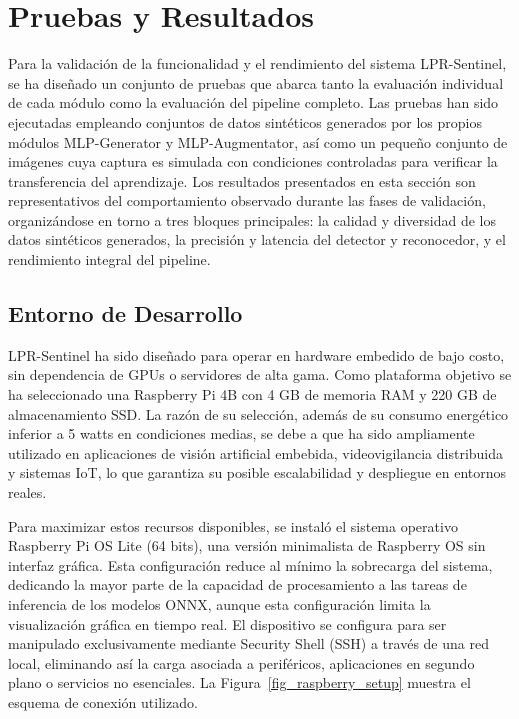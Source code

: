 \section{Pruebas y Resultados}
Para la validación de la funcionalidad y el rendimiento del sistema LPR-Sentinel, se ha diseñado un conjunto de pruebas que abarca tanto la evaluación individual de cada módulo como la evaluación del pipeline completo. Las pruebas han sido ejecutadas empleando conjuntos de datos sintéticos generados por los propios módulos MLP-Generator y MLP-Augmentator, así como un pequeño conjunto de imágenes cuya captura es simulada con condiciones controladas para verificar la transferencia del aprendizaje. Los resultados presentados en esta sección son representativos del comportamiento observado durante las fases de validación, organizándose en torno a tres bloques principales: la calidad y diversidad de los datos sintéticos generados, la precisión y latencia del detector y reconocedor, y el rendimiento integral del pipeline.

\subsection*{Entorno de Desarrollo}
LPR-Sentinel ha sido diseñado para operar en hardware embedido de bajo costo, sin dependencia de GPUs o servidores de alta gama. Como plataforma objetivo se ha seleccionado una Raspberry Pi 4B con 4 GB de memoria RAM y 220 GB de almacenamiento SSD. La razón de su selección, además de su consumo energético inferior a 5 watts en condiciones medias, se debe a que ha sido ampliamente utilizado en aplicaciones de visión artificial embebida, videovigilancia distribuida y sistemas IoT, lo que garantiza su posible escalabilidad y despliegue en entornos reales.

Para maximizar estos recursos disponibles, se instaló el sistema operativo Raspberry Pi OS Lite (64 bits), una versión minimalista de Raspberry OS sin interfaz gráfica. Esta configuración reduce al mínimo la sobrecarga del sistema, dedicando la mayor parte de la capacidad de procesamiento a las tareas de inferencia de los modelos ONNX, aunque esta configuración limita la visualización gráfica en tiempo real. El dispositivo se configura para ser manipulado exclusivamente mediante Security Shell (SSH) a través de una red local, eliminando así la carga asociada a periféricos, aplicaciones en segundo plano o servicios no esenciales. La Figura~\ref{fig_raspberry_setup} muestra el esquema de conexión utilizado.

